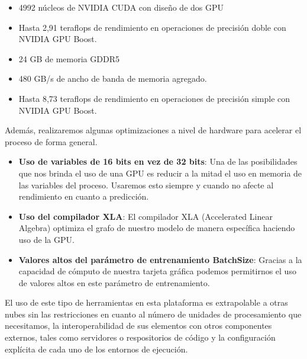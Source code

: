 \begin{itemize}
\item 4992 núcleos de NVIDIA CUDA con diseño de dos GPU
\item Hasta 2,91 teraflops de rendimiento en operaciones de precisión doble con NVIDIA GPU Boost.
\item 24 GB de memoria GDDR5
\item 480 GB/s de ancho de banda de memoria agregado.
\item Hasta 8,73 teraflops de rendimiento en operaciones de precisión simple con NVIDIA GPU Boost.
\end{itemize}

Además, realizaremos algunas optimizaciones a nivel de hardware para acelerar el proceso de forma general.

\begin{itemize}
    \item \textbf{Uso de variables de 16 bits en vez de 32 bits}: Una de las posibilidades que nos brinda el uso de una GPU es reducir a la mitad el uso en memoria de las variables del proceso.
    Usaremos esto siempre y cuando no afecte al rendimiento en cuanto a predicción.
    \item \textbf{Uso del compilador XLA}: El compilador XLA (Accelerated Linear Algebra) optimiza el grafo de nuestro modelo de manera específica haciendo uso de la GPU.
    \item \textbf{Valores altos del parámetro de entrenamiento BatchSize}: Gracias a la capacidad de cómputo de nuestra tarjeta gráfica podemos permitirnos el uso de valores altos en este parámetro de entrenamiento.
\end{itemize}

El uso de este tipo de herramientas en esta plataforma es extrapolable a otras nubes sin las restricciones en cuanto al número de unidades de procesamiento que necesitamos,
la interoperabilidad de sus elementos con otros componentes externos, tales como servidores o respositorios de código y la configuración explícita de cada uno de los entornos de ejecución.